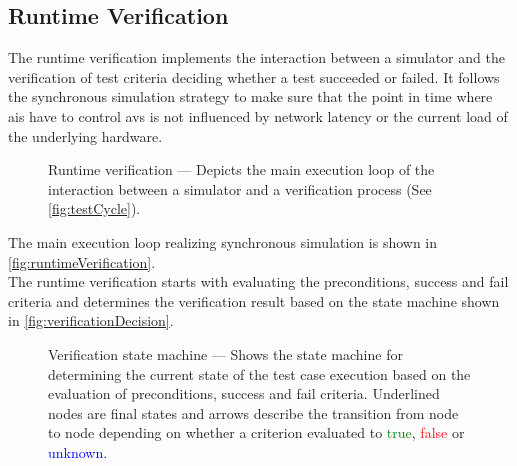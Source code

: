 \subsection{Runtime Verification}\label{sec:runtimeVerification}
The runtime verification implements the interaction between a simulator and the verification of test criteria deciding whether a test succeeded or failed.
It follows the synchronous simulation strategy to make sure that the point in time where \glspl{ai} have to control \glspl{av} is not influenced by network latency or the current load of the underlying hardware.
\begin{figure}
    \centering
    \caption{%
        Runtime verification --- Depicts the main execution loop of the interaction between a simulator and a verification process (See \autoref{fig:testCycle}).
    }\label{fig:runtimeVerification}
    \medskip
\end{figure}
The main execution loop realizing synchronous simulation is shown in \autoref{fig:runtimeVerification}.\\
The runtime verification starts with evaluating the preconditions, success and fail criteria and determines the verification result based on the state machine shown in \autoref{fig:verificationDecision}.
\begin{figure}
    \centering
    \caption{%
        Verification state machine --- Shows the state machine for determining the current state of the test case execution based on the evaluation of preconditions, success and fail criteria.
        Underlined nodes are final states and arrows describe the transition from node to node depending on whether a criterion evaluated to \textcolor{green}{true}, \textcolor{red}{false} or \textcolor{blue}{unknown}.
    }\label{fig:verificationDecision}
    \medskip
\end{figure}
